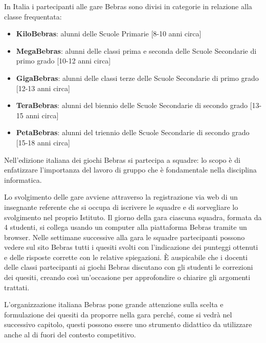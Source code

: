 \documentclass[12pt]{report}
\begin{document}
In Italia i partecipanti alle gare Bebras sono divisi in categorie in relazione alla classe frequentata:
\begin{itemize}
	\item \textbf{KiloBebras}: alunni delle Scuole Primarie [8-10 anni circa]
	\item \textbf{MegaBebras}: alunni delle classi prima e seconda delle Scuole Secondarie di primo grado [10-12 anni circa]
	\item \textbf{GigaBebras}: alunni delle classi terze delle Scuole Secondarie di primo grado [12-13 anni circa]
	\item \textbf{TeraBebras}: alunni del biennio delle Scuole Secondarie di secondo grado [13-15 anni circa]
	\item \textbf{PetaBebras}: alunni del triennio delle Scuole Secondarie di secondo grado [15-18 anni circa]
\end{itemize}
Nell'edizione italiana dei giochi Bebras si partecipa a squadre: lo scopo è di enfatizzare l'importanza del lavoro di gruppo che è fondamentale nella disciplina informatica. 

Lo svolgimento delle gare avviene attraverso la registrazione via web di un insegnante referente che si occupa di iscrivere le squadre e di sorvegliare lo svolgimento nel proprio Istituto. Il giorno della gara ciascuna squadra, formata da 4 studenti, si collega usando un computer alla piattaforma Bebras \cite{PiattaformaBebras} tramite un browser.  
Nelle settimane successive alla gara le squadre partecipanti possono vedere sul sito Bebras tutti i quesiti svolti con l'indicazione dei punteggi ottenuti e delle risposte corrette con le relative spiegazioni. \`{E} auspicabile che i docenti delle classi partecipanti ai giochi Bebras discutano con gli studenti le correzioni dei quesiti, creando così un'occasione per approfondire o chiarire gli argomenti trattati.

L'organizzazione italiana Bebras pone grande attenzione sulla scelta e formulazione dei quesiti da proporre nella gara perché, come si vedrà nel successivo capitolo, questi possono essere uno strumento didattico da utilizzare anche al di fuori del contesto competitivo.
\bigskip
\end{document}
